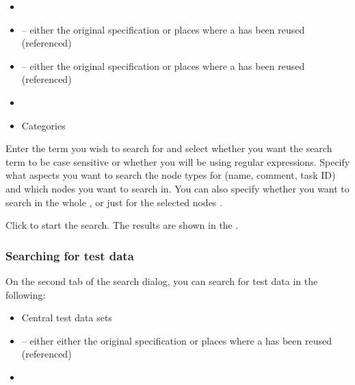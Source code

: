 \begin{itemize}
\item \gdsteps{}
\item \gdcases{} -- either the original specification or places where a \gdcase{} has been reused (referenced)
\item \gdsuites{} -- either the original specification or places where a \gdsuite{} has been reused (referenced)
\item \gdjobs{}
\item Categories
\end{itemize}

Enter the term you wish to search for and select whether you want the search term to be case sensitive or whether you will be using regular expressions. Specify what aspects you want to search the node types for (name, comment, task ID) and which nodes you want to search in. You can also specify whether you want to search in the whole \gdproject{}, or just for the selected nodes .

Click  to start the search. The results are shown in the \gdsearchresultview{} . 


\subsubsection{Searching for test data}
\label{TasksSearchData}

On the second tab of the search dialog, you can search for test data in the following:

\begin{itemize}
\item Central test data sets
\item \gdcases{} -- either either the original specification or places where a \gdcase{} has been reused (referenced)
\item \gdsteps{}
\end{itemize}


